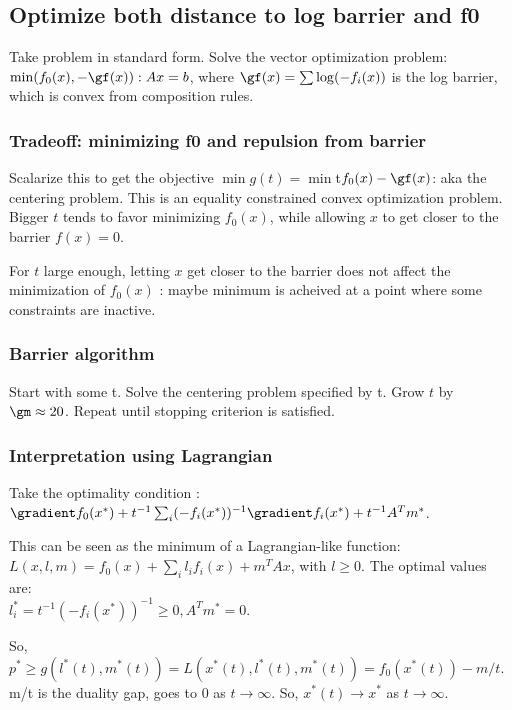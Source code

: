 \documentclass[oneside, article]{memoir}
\begin{document}
\subsection{Optimize both distance to log barrier and f0}
Take problem in standard form. Solve the vector optimization problem: \\
$\min (f_0(x), -\gf(x)) : Ax = b$, where $\gf(x) = \sum \log(-f_i(x))$ is the log barrier, which is convex from composition rules.

\subsubsection{Tradeoff: minimizing f0 and repulsion from barrier}
Scalarize this to get the objective $\min g(t) = \min $t$ f_0(x) - \gf(x)$: aka the centering problem. This is an equality constrained convex optimization problem. Bigger $t$ tends to favor minimizing $f_0(x)$, while allowing $x$ to get closer to the barrier $f(x) = 0$.

For $t$ large enough, letting $x$ get closer to the barrier does not affect the minimization of $f_0(x)$ : maybe minimum is acheived at a point where some constraints are inactive.

\subsubsection{Barrier algorithm}
Start with some t. Solve the centering problem specified by t. Grow $t$ by $\gm \approx 20$. Repeat until stopping criterion is satisfied.

\subsubsection{Interpretation using Lagrangian}
Take the optimality condition : \\
$\gradient f_0(x^{*}) +t^{-1}\sum_i (-f_i(x^{*}))^{-1}\gradient f_i(x^{*}) + t^{-1}A^{T}m^{*}$.

This can be seen as the minimum of a Lagrangian-like function: $L(x, l, m) = f_0(x) + \sum_i l_i f_i(x) +  m^{T}Ax$, with $l \geq 0$. The optimal values are: \\
$l_i^{*} =  t^{-1}(-f_i(x^{*}))^{-1} \geq 0, A^{T}m^{*} = 0$.

So, $p^{*} \geq g(l^{*}(t), m^{*}(t)) = L(x^{*}(t),l^{*}(t), m^{*}(t)) = f_0(x^{*}(t)) - m/t$. m/t is the duality gap, goes to 0 as $t \to \infty$. So, $x^{*}(t) \to x^{*}$ as $t \to \infty$. 
\end{document}
